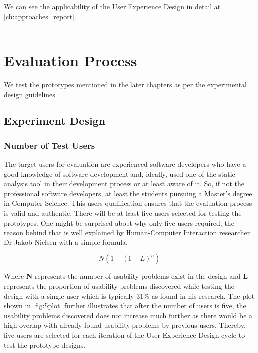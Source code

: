 We can see the applicability of the User Experience Design in detail at \autoref{ch:approaches_report}. \\ \\


\section{Evaluation Process}

We test the prototypes mentioned in the later chapters as per the experimental design guidelines.

\subsection{Experiment Design}

\subsubsection{Number of Test Users}

The target users for evaluation are experienced software developers who have a good knowledge of software development and, ideally, used one of the static analysis tool in their development process or at least aware of it. So, if not the professional software developers, at least the students pursuing a Master’s degree in Computer Science. This users qualification ensures that the evaluation process is valid and authentic. There will be at least five users selected for testing the prototypes. One might be surprised about why only five users required, the reason behind that is well explained by Human-Computer Interaction researcher Dr Jakob Nielsen with a simple formula. \cite{five}

\[ N (1-(1- L )^n ) \]

Where \textbf{N} represents the number of usability problems exist in the design and \textbf{L} represents the proportion of usability problems discovered while testing the design with a single user which is typically 31\% as found in his research. \cite{5users} The plot shown in \autoref{fig:5plot} further illustrates that after the number of users is five, the usability problems discovered does not increase much further as there would be a high overlap with already found usability problems by previous users. Thereby, five users are selected for each iteration of the User Experience Design cycle to test the prototype designs. \\ \\

